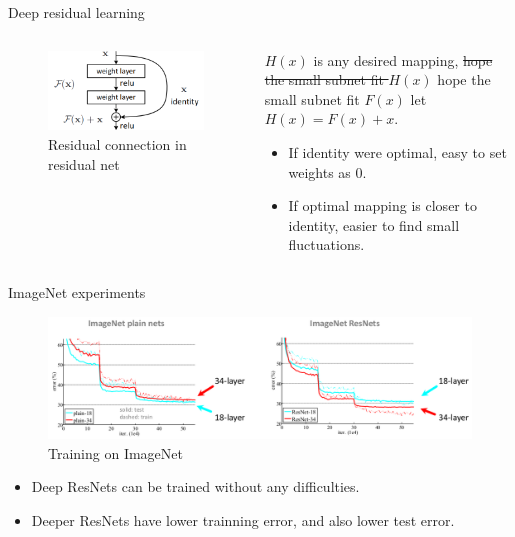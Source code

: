 \documentclass[aspectratio=169]{beamer}
\begin{document}
\begin{frame}{Deep residual learning}
\begin{columns}[T,c,onlytextwidth]
\begin{figure}
    \includegraphics[scale=0.3]{demo/figs/residual.png}
    \caption{Residual connection in residual net}
    \label{fig:residual}
\end{figure}

\begin{alertblock}{}
$H(x)$ is any desired mapping, \st{hope the small subnet fit $H(x)$} hope the small subnet fit $F(x)$ let $H(x) = F(x) + x$.
\begin{itemize}
    \item If identity were optimal, easy to set weights as 0.
    \item If optimal mapping is closer to identity, easier to find small fluctuations.
\end{itemize}
\end{alertblock}
\end{columns}
\end{frame}

\begin{frame}{ImageNet experiments}
\begin{figure}
    \centering
    \includegraphics[scale=0.35]{demo/figs/imgnetex.png}
    \caption{Training on ImageNet}
    \label{fig:imgnetresnet}
\end{figure}

\begin{itemize}
    \item Deep ResNets can be trained without any difficulties.
    \item Deeper ResNets have lower trainning error, and also lower test error.
\end{itemize}
\end{frame}
\end{document}
